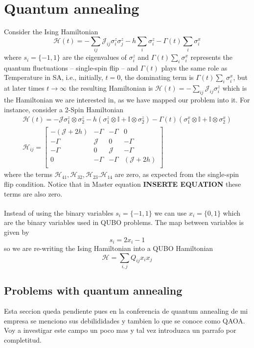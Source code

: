 \section{Quantum annealing}
Consider the Ising Hamiltonian
\begin{equation}
    \mathcal{H}(t) = -\sum_{ij}\mathcal{J}_{ij}\sigma_{i}^{z}\sigma_{j}^{z} - h\sum_{i}\sigma_{i}^{z} - \Gamma(t)\sum_{i}\sigma_{i}^{x}
\end{equation}
where $s_{i} = \{-1,1\}$ are the eigenvalues of $\sigma_{i}^{z}$ and $\Gamma(t)\sum_{i}\sigma_{i}^{x}$ represents the quantum fluctuations -- single-spin flip -- and $\Gamma(t)$ plays the same role as Temperature in SA, i.e., initially, $t=0$, the dominating term is $\Gamma(t)\sum_{i}\sigma_{i}^{x}$, but at later times $t \rightarrow \infty$ the resulting Hamiltonian is $\mathcal{H}(t) = -\sum_{ij}\mathcal{J}_{ij}\sigma_{i}^{z}$ which is the Hamiltonian we are interested in, as we have mapped our problem into it. For instance, consider a 2-Spin Hamiltonian
\begin{align}
    \mathcal{H}(t) = -\mathcal{J}\sigma_{1}^{z}\otimes \sigma_{2}^{z} - h\left(\sigma_{1}^{z}\otimes \mathbb{I} + \mathbb{I}\otimes \sigma_{2}^{z}\right) - \Gamma(t) \left(\sigma_{1}^{x}\otimes\mathbb{I} + \mathbb{I}\otimes \sigma_{2}^{x}\right)\\
    \mathcal{H}_{ij}= \begin{bmatrix}
        -\left(\mathcal{J} + 2h\right) & -\Gamma & -\Gamma & 0 \\
        -\Gamma & \mathcal{J} & 0 & -\Gamma \\
        -\Gamma & 0 & \mathcal{J} & -\Gamma \\
        0 & -\Gamma & -\Gamma & \left(\mathcal{J} + 2h\right) \\
    \end{bmatrix}
\end{align}
where the terms $\mathcal{H}_{41},\mathcal{H}_{32}, \mathcal{H}_{23}. \mathcal{H}_{14}$ are zero, as expected from the single-spin flip condition. Notice that in Master equation \textbf{INSERTE EQUATION} these terms are also zero.\\\\
Instead of using the binary variables $s_{i} = \{-1,1\}$ we can use $x_{i} = \{0,1\}$ which are the binary variables used in QUBO problems. The map between variables is given by
\begin{equation}
    s_{i} = 2x_{i} -1
\end{equation}
so we are re-writing the Ising Hamiltonian into a QUBO Hamiltonian
\begin{equation}
    \mathcal{H} = \sum_{i,j}Q_{ij}x_{i}x_{j}
\end{equation}
\subsection{Problems with quantum annealing}
Esta seccion queda pendiente pues en la conferencia de quantum annealing de mi empresa se menciono sus debilididades y tambien lo que se conoce como QAOA. Voy a investigar este campo un poco mas y tal vez introduzca un parrafo por completitud.
